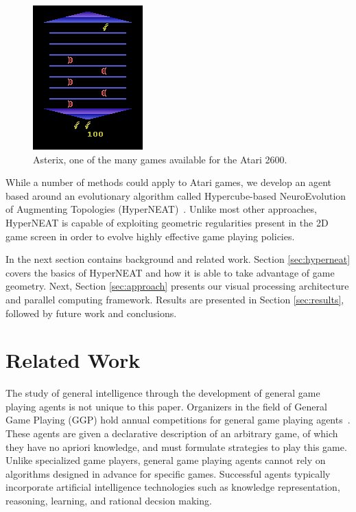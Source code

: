 \documentclass{acm_proc_article-sp}
\begin{document}
\begin{figure}[t]
\begin{center}
\includegraphics[width=.5\columnwidth]{figures/asterix.png}
\end{center}
\caption{Asterix, one of the many games available for the Atari 2600.}
\label{fig:asterix}
\end{figure}

While a number of methods could apply to Atari games, we develop an agent based around an evolutionary algorithm called Hypercube-based NeuroEvolution of Augmenting Topologies (HyperNEAT)~\cite{gauci08}. Unlike most other approaches, HyperNEAT is capable of exploiting geometric regularities present in the 2D game screen in order to evolve highly effective game playing policies. 

In the next section contains background and related work. Section \ref{sec:hyperneat} covers the basics of HyperNEAT and how it is able to take advantage of game geometry. Next, Section \ref{sec:approach} presents our visual processing architecture and parallel computing framework. Results are presented in Section \ref{sec:results}, followed by future work and conclusions.

\section{Related Work}
\label{sec:background}
The study of general intelligence through the development of general game playing agents is not unique to this paper. Organizers in the field of General Game Playing (GGP) hold annual competitions for general game playing agents~\cite{genesereth05}. These agents are given a declarative description of an arbitrary game, of which they have no apriori knowledge, and must formulate strategies to play this game. Unlike specialized game players, general game playing agents cannot rely on algorithms designed in advance for specific games. Successful agents typically incorporate artificial intelligence technologies such as knowledge representation, reasoning, learning, and rational decsion making. 
\end{document}
